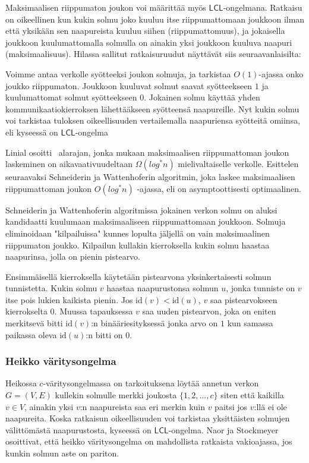 \documentclass[12pt,finnish]{tktltiki2}
\theoremstyle{definition}
\theoremstyle{remark}
\newcommand*{\lcl}{\ensuremath{\mathsf{LCL}}}
\begin{document}
Maksimaalisen riippumaton joukon voi määrittää myös \lcl -ongelmana. Ratkaisu on oikeellinen kun kukin solmu joko kuuluu itse riippumattomaan joukkoon ilman että yksikään sen naapureista kuuluu siihen (riippumattomuus), ja jokaisella joukkoon kuulumattomalla solmulla on ainakin yksi joukkoon kuuluva naapuri (maksimaalisuus). Hilassa sallitut ratkaisuruudut näyttävät siis seuraavanlaisilta:

Voimme antaa verkolle syötteeksi joukon solmuja, ja tarkistaa $O(1)$-ajassa onko joukko riippumaton. Joukkoon kuuluvat solmut saavat syötteekseen $1$ ja kuulumattomat solmut syötteekseen $0$. Jokainen solmu käyttää yhden kommunikaatiokierroksen lähettääkseen syötteensä naapureille. Nyt kukin solmu voi tarkistaa tuloksen oikeellisuuden vertailemalla naapuriensa syötteitä omiinsa, eli kyseessä on \lcl -ongelma

Linial osoitti~\cite{linial92} alarajan, jonka mukaan maksimaalisen riippumattoman joukon laskeminen on aikavaativuudeltaan $\Omega(log^* n)$ mielivaltaiselle verkolle. Esittelen seuraavaksi Schneiderin ja Wattenhoferin algoritmin, joka laskee maksimaalisen riippumattoman joukon $O(log^* n)$ -ajassa, eli on asymptoottisesti optimaalinen.

Schneiderin ja Wattenhoferin algoritmissa jokainen verkon solmu on aluksi kandidaatti kuulumaan maksimaaliseen riippumattomaan joukkoon. Solmuja eliminoidaan "kilpailuissa" kunnes lopulta jäljellä on vain maksimaalinen riippumaton joukko. Kilpailun kullakin kierroksella kukin solmu haastaa naapurinsa, jolla on pienin pistearvo.

Ensimmäisellä kierroksella käytetään pistearvona yksinkertaisesti solmun tunnistetta. Kukin solmu $v$ haastaa naapurustonsa solmun $u$, jonka tunniste on $v$ itse pois lukien kaikista pienin. Jos $\text{id}(v) < \text{id}(u)$, $v$ saa pistearvokseen kierrokselta $0$. Muussa tapauksessa $v$ saa uuden pistearvon, joka on eniten merkitsevä bitti $\text{id}(v)$:n binääriesityksessä jonka arvo on $1$ kun samassa paikassa oleva $\text{id}(u)$:n bitti on $0$.
 
\iffalse
\subsubsection{Heikko väritysongelma}
Heikossa $c$-väritysongelmassa on tarkoituksena löytää annetun verkon $G = (V, E)$ kullekin solmulle merkki joukosta $\{1, 2, ..., c\}$ siten että kaikilla $v \in V$, ainakin yksi $v$:n naapureista saa eri merkin kuin $v$ paitsi jos $v$:llä ei ole naapureita. Koska ratkaisun oikeellisuuden voi tarkistaa yksittäisten solmujen välittömästä naapurustosta, kyseessä on \lcl -ongelma. Naor ja Stockmeyer~\cite{naor95} osoittivat, että heikko väritysongelma on mahdollista ratkaista vakioajassa, jos kunkin solmun aste on pariton.
\end{document}
